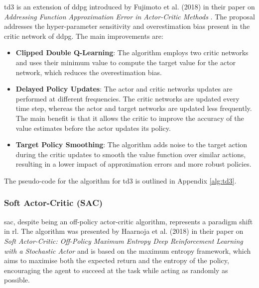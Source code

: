 \acrfull{td3} is an extension of \acrshort{ddpg} introduced by Fujimoto et al. (2018) in their paper on \textit{Addressing Function Approximation Error in Actor-Critic Methods} \cite{Fujimoto2018}. The proposal addresses the hyper-parameter sensitivity and overestimation bias present in the critic network of \acrshort{ddpg}. The main improvements are:
\begin{itemize}
    \item \textbf{Clipped Double Q-Learning}: The algorithm employs two critic networks and uses their minimum value to compute the target value for the actor network, which reduces the overestimation bias. 
    \item \textbf{Delayed Policy Updates}: The actor and critic networks updates are performed at different frequencies. The critic networks are updated every time step, whereas the actor and target networks are updated less frequently. The main benefit is that it allows the critic to improve the accuracy of the value estimates before the actor updates its policy.
    \item \textbf{Target Policy Smoothing}: The algorithm adds noise to the target action during the critic updates to smooth the value function over similar actions, resulting in a lower impact of approximation errors and more robust policies. 
\end{itemize}

The pseudo-code for the algorithm for \acrshort{td3} is outlined in Appendix \ref{alg:td3}.

\subsubsection{Soft Actor-Critic (SAC)} \label{sec:sac}

\acrfull{sac}, despite being an off-policy actor-critic algorithm, represents a paradigm shift in \acrshort{rl}. The algorithm was presented by Haarnoja et al. (2018) in their paper on \textit{Soft Actor-Critic: Off-Policy Maximum Entropy Deep Reinforcement Learning with a Stochastic Actor} \cite{Haarnoja2018} and is based on the maximum entropy framework, which aims to maximise both the expected return and the \gls{entropy} of the policy, encouraging the agent to succeed at the task while acting as randomly as possible. 


